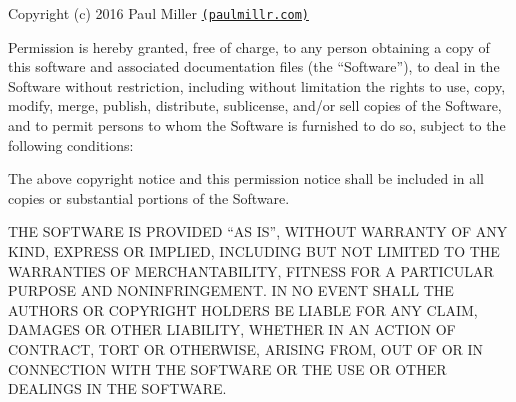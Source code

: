 Copyright (c) 2016 Paul Miller \href{http://paulmillr.com}{\tt (paulmillr.\+com)}

Permission is hereby granted, free of charge, to any person obtaining a copy of this software and associated documentation files (the “\+Software”), to deal in the Software without restriction, including without limitation the rights to use, copy, modify, merge, publish, distribute, sublicense, and/or sell copies of the Software, and to permit persons to whom the Software is furnished to do so, subject to the following conditions\+:

The above copyright notice and this permission notice shall be included in all copies or substantial portions of the Software.

T\+HE S\+O\+F\+T\+W\+A\+RE IS P\+R\+O\+V\+I\+D\+ED “\+AS I\+S”, W\+I\+T\+H\+O\+UT W\+A\+R\+R\+A\+N\+TY OF A\+NY K\+I\+ND, E\+X\+P\+R\+E\+SS OR I\+M\+P\+L\+I\+ED, I\+N\+C\+L\+U\+D\+I\+NG B\+UT N\+OT L\+I\+M\+I\+T\+ED TO T\+HE W\+A\+R\+R\+A\+N\+T\+I\+ES OF M\+E\+R\+C\+H\+A\+N\+T\+A\+B\+I\+L\+I\+TY, F\+I\+T\+N\+E\+SS F\+OR A P\+A\+R\+T\+I\+C\+U\+L\+AR P\+U\+R\+P\+O\+SE A\+ND N\+O\+N\+I\+N\+F\+R\+I\+N\+G\+E\+M\+E\+NT. IN NO E\+V\+E\+NT S\+H\+A\+LL T\+HE A\+U\+T\+H\+O\+RS OR C\+O\+P\+Y\+R\+I\+G\+HT H\+O\+L\+D\+E\+RS BE L\+I\+A\+B\+LE F\+OR A\+NY C\+L\+A\+IM, D\+A\+M\+A\+G\+ES OR O\+T\+H\+ER L\+I\+A\+B\+I\+L\+I\+TY, W\+H\+E\+T\+H\+ER IN AN A\+C\+T\+I\+ON OF C\+O\+N\+T\+R\+A\+CT, T\+O\+RT OR O\+T\+H\+E\+R\+W\+I\+SE, A\+R\+I\+S\+I\+NG F\+R\+OM, O\+UT OF OR IN C\+O\+N\+N\+E\+C\+T\+I\+ON W\+I\+TH T\+HE S\+O\+F\+T\+W\+A\+RE OR T\+HE U\+SE OR O\+T\+H\+ER D\+E\+A\+L\+I\+N\+GS IN T\+HE S\+O\+F\+T\+W\+A\+RE. 